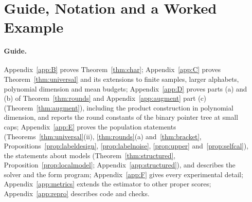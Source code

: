 \section{Guide, Notation and a Worked Example}\label{app:notation}
\paragraph{Guide.}
Appendix~\ref{app:B} proves Theorem~\ref{thm:char}; Appendix~\ref{app:C} proves Theorem~\ref{thm:universal} and its extensions to finite samples, larger alphabets, polynomial dimension and mean budgets; Appendix~\ref{app:D} proves parts (a) and (b) of Theorem~\ref{thm:rounds} and Appendix~\ref{app:augment} part (c) (Theorem~\ref{thm:augment}), including the product construction in polynomial dimension, and reports the round constants of the binary pointer tree at small caps; Appendix~\ref{app:E} proves the population statements (Theorems~\ref{thm:universal}(ii), \ref{thm:rounds}(a) and~\ref{thm:bracket}, Propositions~\ref{prop:labeldesign}, \ref{prop:labelnoise}, \ref{prop:upper} and~\ref{prop:selfcal}), the statements about models (Theorem~\ref{thm:structured}, Proposition~\ref{prop:localmodel}; Appendix~\ref{app:structured}), and describes the solver and the form program; Appendix~\ref{app:F} gives every experimental detail; Appendix~\ref{app:metrics} extends the estimator to other proper scores; Appendix~\ref{app:repro} describes code and checks.

